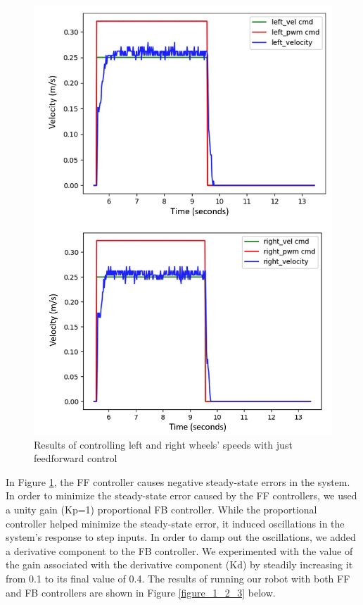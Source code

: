 \documentclass[journal]{IEEEtran}
\begin{document}
\begin{figure}[h]
\begin{center}
\includegraphics[width=0.84\linewidth]{image_1/figure_1_2_2.jpg}
\end{center}
   \caption{Results of controlling left and right wheels’ speeds with just feedforward control}
   \label{figure_1_2_2}
\end{figure}

In Figure \ref{figure_1_2_2}, the FF controller causes negative steady-state errors in the system. In order to minimize the steady-state error caused by the FF controllers, we used a unity gain (Kp=1) proportional FB controller. While the proportional controller helped minimize the steady-state error, it induced oscillations in the system’s response to step inputs. In order to damp out the oscillations, we added a derivative component to the FB controller. We experimented with the value of the gain associated with the derivative component (Kd) by steadily increasing it from 0.1 to its final value of 0.4. The results of running our robot with both FF and FB controllers are shown in Figure \ref{figure_1_2_3} below.
\end{document}
